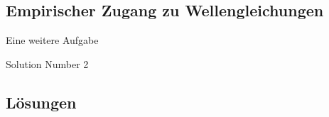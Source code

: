 \documentclass[18pt,a4paper]{article}
\begin{document}
\subsection{Empirischer Zugang zu Wellengleichungen}

\begin{exercise}[difficulty=hard]
Eine weitere Aufgabe
\end{exercise}
\begin{solution}
Solution Number 2
\end{solution}

\subsection*{Lösungen}
\printsolutions[section]
\end{document}
